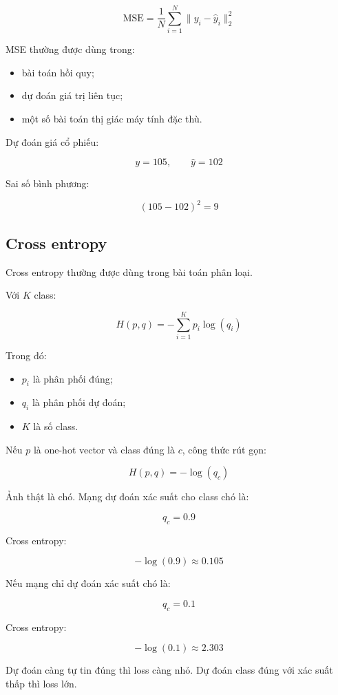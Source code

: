 \[
    \text{MSE}
    =
    \frac{1}{N}
    \sum_{i=1}^{N}
    \|y_i-\hat{y}_i\|_2^2
\]

MSE thường được dùng trong:

\begin{itemize}
    \item bài toán hồi quy;
    \item dự đoán giá trị liên tục;
    \item một số bài toán thị giác máy tính đặc thù.
\end{itemize}

\begin{vidu}
Dự đoán giá cổ phiếu:

\[
    y = 105,\qquad \hat{y}=102
\]

Sai số bình phương:

\[
    (105-102)^2=9
\]
\end{vidu}

\subsection{Cross entropy}

Cross entropy thường được dùng trong bài toán phân loại.

Với $K$ class:

\[
    H(p,q)
    =
    -\sum_{i=1}^{K}p_i\log(q_i)
\]

Trong đó:

\begin{itemize}
    \item $p_i$ là phân phối đúng;
    \item $q_i$ là phân phối dự đoán;
    \item $K$ là số class.
\end{itemize}

Nếu $p$ là one-hot vector và class đúng là $c$, công thức rút gọn:

\[
    H(p,q)=-\log(q_c)
\]

\begin{vidu}
Ảnh thật là chó. Mạng dự đoán xác suất cho class chó là:

\[
    q_c=0.9
\]

Cross entropy:

\[
    -\log(0.9)\approx 0.105
\]

Nếu mạng chỉ dự đoán xác suất chó là:

\[
    q_c=0.1
\]

Cross entropy:

\[
    -\log(0.1)\approx 2.303
\]

Dự đoán càng tự tin đúng thì loss càng nhỏ. Dự đoán class đúng với xác suất thấp thì loss lớn.
\end{vidu}

